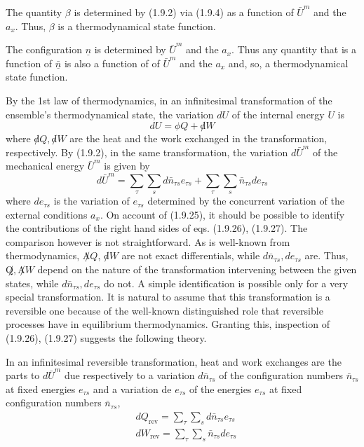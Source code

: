 \documentclass{article}
\begin{document}
The quantity $\beta$ is determined by (1.9.2) via (1.9.4) as a function of $\bar{U}^{m}$ and the $a_{x}$. Thus, $\beta$ is a thermodynamical state function.

The configuration $\underline{n}$ is determined by $\bar{U}^{m}$ and the $a_{x}$. Thus any quantity that is a function of $\underline{\bar{n}}$ is also a function of of $\bar{U}^{m}$ and the $a_{x}$ and, so, a thermodynamical state function.

By the 1st law of thermodynamics, in an infinitesimal transformation of the ensemble's thermodynamical state, the variation $d U$ of the internal energy $U$ is
$$
\begin{equation*}
d U=\phi Q+\not d W \tag{1.9.26}
\end{equation*}
$$
where $\not d Q, \not d W$ are the heat and the work exchanged in the transformation, respectively. By (1.9.2), in the same transformation, the variation $d \bar{U}^{m}$ of the mechanical energy $\bar{U}^{m}$ is given by
$$
\begin{equation*}
d \bar{U}^{m}=\sum_{\tau} \sum_{s} d \bar{n}_{\tau s} e_{\tau s}+\sum_{\tau} \sum_{s} \bar{n}_{\tau s} d e_{\tau s} \tag{1.9.27}
\end{equation*}
$$
where $d e_{\tau s}$ is the variation of $e_{\tau s}$ determined by the concurrent variation of the external conditions $a_{x}$. On account of (1.9.25), it should be possible to identify the contributions of the right hand sides of eqs. (1.9.26), (1.9.27). The comparison however is not straightforward. As is well-known from thermodynamics, $\not A Q$, $\not d W$ are not exact differentials, while $d \bar{n}_{\tau s}, d e_{\tau s}$ are. Thus, $\not Q, \not A W$ depend on the nature of the transformation intervening between the given states, while $d \bar{n}_{\tau s}, d e_{\tau s}$ do not. A simple identification is possible only for a very special transformation. It is natural to assume that this transformation is a reversible one because of the well-known distinguished role that reversible processes have in equilibrium thermodynamics. Granting this, inspection of (1.9.26), (1.9.27) suggests the following theory.

In an infinitesimal reversible transformation, heat and work exchanges are the parts to $d \bar{U}^{m}$ due respectively to a variation $d \bar{n}_{\tau s}$ of the configuration numbers $\bar{n}_{\tau s}$ at fixed energies $e_{\tau s}$ and a variation de $e_{\tau s}$ of the energies $e_{\tau s}$ at fixed configuration numbers $\bar{n}_{\tau s}$,
$$
\begin{align*}
& d Q_{\mathrm{rev}}=\sum_{\tau} \sum_{s} d \bar{n}_{\tau s} e_{\tau s}  \tag{1.9.28}\\
& d W_{\mathrm{rev}}=\sum_{\tau} \sum_{s} \bar{n}_{\tau s} d e_{\tau s} \tag{1.9.29}
\end{align*}
$$
\end{document}
